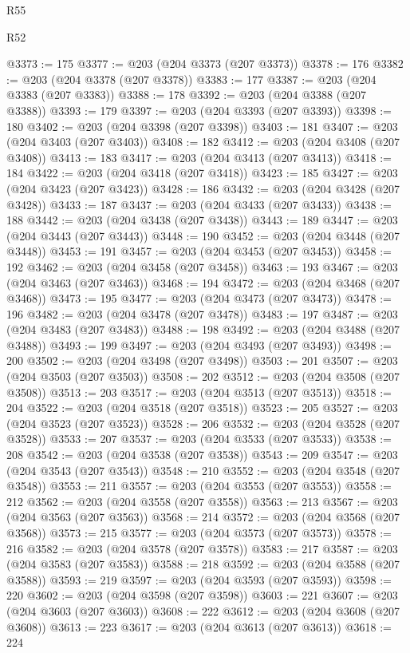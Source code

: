 \begin{lexlean}{R55}
\begin{lexlean}{R52}
\begin{coremodule}
{{{{{{{{{{{{{{{{{{{{{{{{{{{{{{{{{{{{{{{{{{{{{{{{{{{{{{{{{{{{{{{{{{{{{{{{{{{{{{{{{{{{{{{{{{{{{{{{{{{{{{{{{{{{{{{{{{{{{{{{{{{{{{{{{{{{{{{{{{{{{{{{{{{{{{{{{{{{{{{{{{{{{{{{{{{{{{{{{{{{{{{{{{{{{{{{{{{{{{@3373 := 175
@3377 := @203 (@204 @3373 (@207 @3373))
@3378 := 176
@3382 := @203 (@204 @3378 (@207 @3378))
@3383 := 177
@3387 := @203 (@204 @3383 (@207 @3383))
@3388 := 178
@3392 := @203 (@204 @3388 (@207 @3388))
@3393 := 179
@3397 := @203 (@204 @3393 (@207 @3393))
@3398 := 180
@3402 := @203 (@204 @3398 (@207 @3398))
@3403 := 181
@3407 := @203 (@204 @3403 (@207 @3403))
@3408 := 182
@3412 := @203 (@204 @3408 (@207 @3408))
@3413 := 183
@3417 := @203 (@204 @3413 (@207 @3413))
@3418 := 184
@3422 := @203 (@204 @3418 (@207 @3418))
@3423 := 185
@3427 := @203 (@204 @3423 (@207 @3423))
@3428 := 186
@3432 := @203 (@204 @3428 (@207 @3428))
@3433 := 187
@3437 := @203 (@204 @3433 (@207 @3433))
@3438 := 188
@3442 := @203 (@204 @3438 (@207 @3438))
@3443 := 189
@3447 := @203 (@204 @3443 (@207 @3443))
@3448 := 190
@3452 := @203 (@204 @3448 (@207 @3448))
@3453 := 191
@3457 := @203 (@204 @3453 (@207 @3453))
@3458 := 192
@3462 := @203 (@204 @3458 (@207 @3458))
@3463 := 193
@3467 := @203 (@204 @3463 (@207 @3463))
@3468 := 194
@3472 := @203 (@204 @3468 (@207 @3468))
@3473 := 195
@3477 := @203 (@204 @3473 (@207 @3473))
@3478 := 196
@3482 := @203 (@204 @3478 (@207 @3478))
@3483 := 197
@3487 := @203 (@204 @3483 (@207 @3483))
@3488 := 198
@3492 := @203 (@204 @3488 (@207 @3488))
@3493 := 199
@3497 := @203 (@204 @3493 (@207 @3493))
@3498 := 200
@3502 := @203 (@204 @3498 (@207 @3498))
@3503 := 201
@3507 := @203 (@204 @3503 (@207 @3503))
@3508 := 202
@3512 := @203 (@204 @3508 (@207 @3508))
@3513 := 203
@3517 := @203 (@204 @3513 (@207 @3513))
@3518 := 204
@3522 := @203 (@204 @3518 (@207 @3518))
@3523 := 205
@3527 := @203 (@204 @3523 (@207 @3523))
@3528 := 206
@3532 := @203 (@204 @3528 (@207 @3528))
@3533 := 207
@3537 := @203 (@204 @3533 (@207 @3533))
@3538 := 208
@3542 := @203 (@204 @3538 (@207 @3538))
@3543 := 209
@3547 := @203 (@204 @3543 (@207 @3543))
@3548 := 210
@3552 := @203 (@204 @3548 (@207 @3548))
@3553 := 211
@3557 := @203 (@204 @3553 (@207 @3553))
@3558 := 212
@3562 := @203 (@204 @3558 (@207 @3558))
@3563 := 213
@3567 := @203 (@204 @3563 (@207 @3563))
@3568 := 214
@3572 := @203 (@204 @3568 (@207 @3568))
@3573 := 215
@3577 := @203 (@204 @3573 (@207 @3573))
@3578 := 216
@3582 := @203 (@204 @3578 (@207 @3578))
@3583 := 217
@3587 := @203 (@204 @3583 (@207 @3583))
@3588 := 218
@3592 := @203 (@204 @3588 (@207 @3588))
@3593 := 219
@3597 := @203 (@204 @3593 (@207 @3593))
@3598 := 220
@3602 := @203 (@204 @3598 (@207 @3598))
@3603 := 221
@3607 := @203 (@204 @3603 (@207 @3603))
@3608 := 222
@3612 := @203 (@204 @3608 (@207 @3608))
@3613 := 223
@3617 := @203 (@204 @3613 (@207 @3613))
@3618 := 224
}}}}}}}}}}}}}}}}}}}}}}}}}}}}}}}}}}}}}}}}}}}}}}}}}}}}}}}}}}}}}}}}}}}}}}}}}}}}}}}}}}}}}}}}}}}}}}}}}}}}}}}}}}}}}}}}}}}}}}}}}}}}}}}}}}}}}}}}}}}}}}}}}}}}}}}}}}}}}}}}}}}}}}}}}}}}}}}}}}}}}}}}}}}}}}}}}}}}}}
\end{coremodule}
\end{lexlean}
\end{lexlean}
